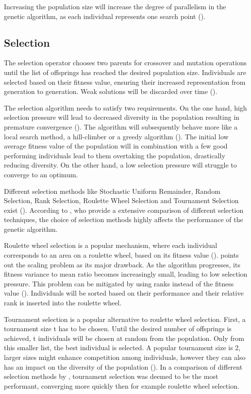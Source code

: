 Increasing the population size will increase the degree of parallelism in the genetic algorithm, as each individual represents one search point (\cite{mills_determining_2015}).

\subsection{Selection}
The selection operator chooses two parents for crossover and mutation operations until the list of offsprings has reached the desired population size. 
Individuals are selected based on their fitness value, ensuring their increased representation from generation to generation. Weak solutions will be discarded over time (\cite{srinivas_genetic_1994}).

The selection algorithm needs to satisfy two requirements. 
On the one hand, high selection pressure will lead to decreased diversity in the population resulting in premature convergence (\cite{katoch_review_2021}). The algorithm will subsequently behave more like a local search method, a hill-climber or a greedy algorithm (\cite{kacprzyk_parameter_2007}). The initial low average fitness value of the population will in combination with a few good performing individuals lead to them overtaking the population, drastically reducing diversity.
On the other hand, a low selection pressure will struggle to converge to an optimum.

Different selection methods like Stochastic Uniform Remainder, Random Selection, Rank Selection, Roulette Wheel Selection and Tournament Selection exist (\cite{majumdar_genetic_2015}). According to \cite{hussain_trade-off_2020}, who provide a extensive comparison of different selection techniques, the choice of selection methods highly affects the performance of the genetic algorithm.

Roulette wheel selection is a popular mechanism, where each individual corresponds to an area on a roulette wheel, based on its fitness value (\cite{holland_adaptation_1992}). \cite{grefenstette_optimization_1986} points out the scaling problem as its major drawback. As the algorithm progresses, its fitness variance to mean ratio becomes increasingly small, leading to low selection pressure.
This problem can be mitigated by using ranks instead of the fitness value (\cite{katoch_review_2021}). Individuals will be sorted based on their performance and their relative rank is inserted into the roulette wheel. 

Tournament selection is a popular alternative to roulette wheel selection. First, a tournament size t has to be chosen. Until the desired number of offsprings is achieved, t individuals will be chosen at random from the population. Only from this smaller list, the best individual is selected. A popular tournament size is 2, larger sizes might enhance competition among individuals, however they can also has an impact on the diversity of the population (\cite{hussain_trade-off_2020}). In a comparison of different selection methods by \cite{jinghui_zhong_comparison_2005}, tournament selection was deemed to be the most performant, converging more quickly then for example roulette wheel selection.

